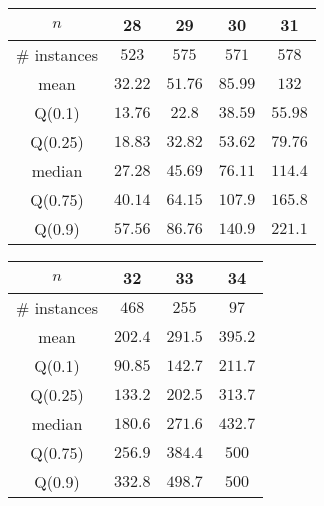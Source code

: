 \begin{tabular}{c|cccc} 
\hline 
$n$ & 28 & 29 & 30 & 31 \tabularnewline 
\hline 
\hline 
\# instances & $523$ & $575$ & $571$ & $578$ \tabularnewline 
mean & $32.22$ & $51.76$ & $85.99$ & $132$ \tabularnewline 
Q(0.1) & $13.76$ & $22.8$ & $38.59$ & $55.98$ \tabularnewline 
Q(0.25) & $18.83$ & $32.82$ & $53.62$ & $79.76$ \tabularnewline 
median & $27.28$ & $45.69$ & $76.11$ & $114.4$ \tabularnewline 
Q(0.75) & $40.14$ & $64.15$ & $107.9$ & $165.8$ \tabularnewline 
Q(0.9) & $57.56$ & $86.76$ & $140.9$ & $221.1$ \tabularnewline 
\hline 
\end{tabular} 
\medskip{} 

\begin{tabular}{c|ccc} 
\hline 
$n$ & 32 & 33 & 34 \tabularnewline 
\hline 
\hline 
\# instances & $468$ & $255$ & $97$ \tabularnewline 
mean & $202.4$ & $291.5$ & $395.2$ \tabularnewline 
Q(0.1) & $90.85$ & $142.7$ & $211.7$ \tabularnewline 
Q(0.25) & $133.2$ & $202.5$ & $313.7$ \tabularnewline 
median & $180.6$ & $271.6$ & $432.7$ \tabularnewline 
Q(0.75) & $256.9$ & $384.4$ & $500$ \tabularnewline 
Q(0.9) & $332.8$ & $498.7$ & $500$ \tabularnewline 
\hline 
\end{tabular} 
\medskip{} 

